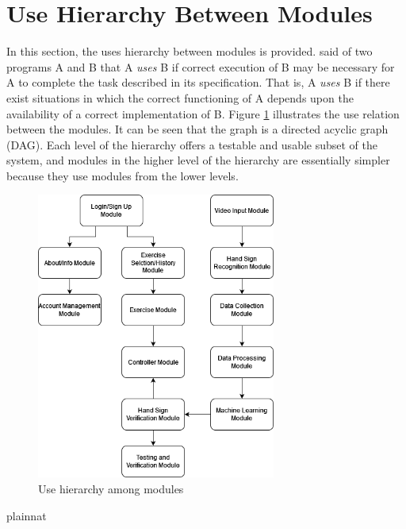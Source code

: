\documentclass[12pt, titlepage]{article}
\begin{document}
\section{Use Hierarchy Between Modules} \label{SecUse}

In this section, the uses hierarchy between modules is
provided. \citet{Parnas1978} said of two programs A and B that A {\em uses} B if
correct execution of B may be necessary for A to complete the task described in
its specification. That is, A {\em uses} B if there exist situations in which
the correct functioning of A depends upon the availability of a correct
implementation of B.  Figure \ref{FigUH} illustrates the use relation between
the modules. It can be seen that the graph is a directed acyclic graph
(DAG). Each level of the hierarchy offers a testable and usable subset of the
system, and modules in the higher level of the hierarchy are essentially simpler
because they use modules from the lower levels.

\begin{figure}[H]
\centering
\includegraphics[width=0.7\textwidth]{UsesHierarchy.png}
\caption{Use hierarchy among modules}
\label{FigUH}
\end{figure}


 {plainnat}


\newpage{}
\end{document}
